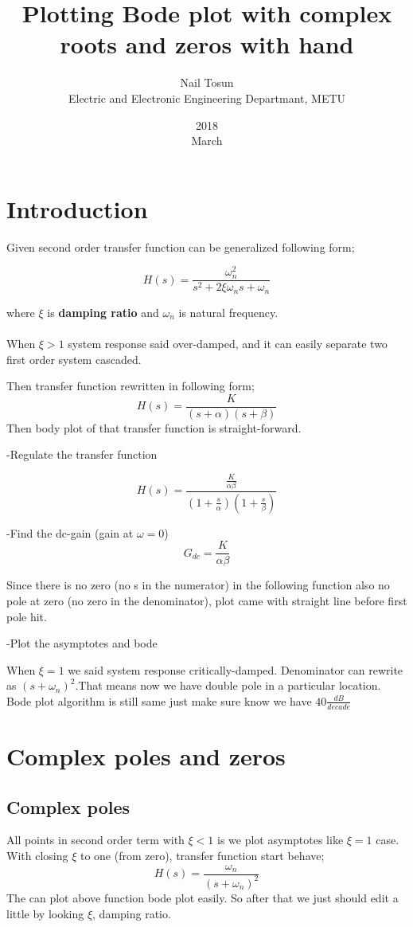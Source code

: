 \documentclass[11pt]{article}
\title{Plotting Bode plot with complex roots and zeros with hand }
\date{2018\\ March}
\author{Nail Tosun \\ Electric and Electronic Engineering Departmant, METU}
\begin{document}
\maketitle
\section*{Introduction}
Given second order transfer function can be generalized following form;

\[H(s)=\frac{\omega_n ^2}{s^2+2\xi \omega_n s + \omega_n
}\]

where $\xi$ is \textbf{damping ratio} and $\omega_n$ is natural frequency. 
\paragraph*{}
When $\xi>1$ system response said over-damped, and it can easily separate two first order system cascaded.

Then transfer function rewritten in following form;
\[H(s)=\frac{K}{(s+\alpha)(s+\beta)}\]
Then body plot of that transfer function is straight-forward. 

-Regulate the transfer function 

\[H(s)=\frac{\frac{K}{\alpha \beta}}{(1+\frac{s}{\alpha})(1+\frac{s}{\beta})}\]

-Find the dc-gain (gain at $\omega=0$)
\[G_{dc}=\frac{K}{\alpha \beta}\]

Since there is no zero (no s in the numerator) in the following function also no pole at zero (no zero in the denominator), plot came with straight line before first pole hit.

-Plot the asymptotes and bode

When $\xi=1$ we said system response critically-damped. Denominator can rewrite as $(s+\omega_n)^2$.That means now we have double pole in a particular location. Bode plot algorithm is still same just make sure know we have $40 \frac{dB}{decade}$ 

\section*{Complex poles and zeros}
\subsection*{Complex poles}
All points in second order term with $\xi <1$ is we plot asymptotes like $\xi=1$ case. With closing $\xi$ to one (from zero), transfer function start behave;
\[H(s)=\frac{\omega_n}{(s+\omega_n)^2}\]
The can plot above function bode plot easily. So after that we just should edit a little by looking $\xi$, damping ratio.
\end{document}
